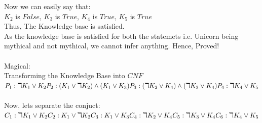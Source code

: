 \documentclass[11pt]{article}
\begin{document}
\begin{enumerate}[label=(\alph*)]
  Now we can easily say that: \\
  $K_2$ is $False$,
  $K_3$ is $True$,
  $K_4$ is $True$,
  $K_5$ is $True$ \\
  Thus, The Knowledge base is satisfied.\\
  As the knowledge base is satisfied for both the statemets i.e. Unicorn being mythical and not mythical,
  we cannot infer anything. Hence, Proved!\\ \\
  Magical:\\
  Transforming the Knowledge Base into $CNF$\\
  $P_1: \daleth K_1 \vee  K_2 \\
  P_2: (K_1 \vee \daleth K_2) \wedge (K_1 \vee K_3) \\
  P_3: (\daleth K_2 \vee  K_4) \wedge (\daleth K_3 \vee  K_4) \\
  P_4: \daleth K_4 \vee  K_5$ \\ \\
  Now, lets separate the conjuct:\\
  $C_1: \daleth K_1 \vee  K_2 \\
  C_2: K_1 \vee \daleth K_2\\
  C_3: K_1 \vee K_3 \\
  C_4: \daleth K_2 \vee  K_4 \\
  C_5: \daleth K_3 \vee  K_4 \\
  C_6: \daleth K_4 \vee  K_5$ \\ \\


\end{enumerate}
\end{document}
